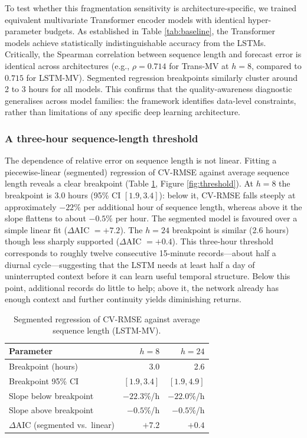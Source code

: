 \documentclass[journal,sensors,submit,pdftex,moreauthors]{Definitions/mdpi}
\begin{document}
To test whether this fragmentation sensitivity is architecture-specific, we trained equivalent multivariate Transformer encoder models with identical hyper-parameter budgets. As established in Table \ref{tab:baseline}, the Transformer models achieve statistically indistinguishable accuracy from the LSTMs. Critically, the Spearman correlation between sequence length and forecast error is identical across architectures (e.g., $\rho = 0.714$ for Trans-MV at $h=8$, compared to $0.715$ for LSTM-MV). Segmented regression breakpoints similarly cluster around 2 to 3 hours for all models. This confirms that the quality-awareness diagnostic generalises across model families: the framework identifies data-level constraints, rather than limitations of any specific deep learning architecture.

\subsubsection{A three-hour sequence-length threshold}

The dependence of relative error on sequence length is not linear. Fitting a piecewise-linear (segmented) regression of CV-RMSE against average sequence length reveals a clear breakpoint (Table \ref{tab:threshold}, Figure \ref{fig:threshold}). At $h=8$ the breakpoint is 3.0 hours (95\% CI $[1.9, 3.4]$): below it, CV-RMSE falls steeply at approximately $-22\%$ per additional hour of sequence length, whereas above it the slope flattens to about $-0.5\%$ per hour. The segmented model is favoured over a simple linear fit ($\Delta$AIC $= +7.2$). The $h=24$ breakpoint is similar (2.6 hours) though less sharply supported ($\Delta$AIC $= +0.4$). This three-hour threshold corresponds to roughly twelve consecutive 15-minute records---about half a diurnal cycle---suggesting that the LSTM needs at least half a day of uninterrupted context before it can learn useful temporal structure. Below this point, additional records do little to help; above it, the network already has enough context and further continuity yields diminishing returns.

\begin{table}[htbp]
    \caption{Segmented regression of CV-RMSE against average sequence length (LSTM-MV).}
    \label{tab:threshold}
    \begin{tabular}{@{}lrr@{}}
        \toprule
        \textbf{Parameter} & \textbf{$h=8$} & \textbf{$h=24$} \\
        \midrule
        Breakpoint (hours)       & 3.0 & 2.6 \\
        Breakpoint 95\% CI       & $[1.9, 3.4]$ & $[1.9, 4.9]$ \\
        Slope below breakpoint   & $-22.3$\%/h & $-22.0$\%/h \\
        Slope above breakpoint   & $-0.5$\%/h  & $-0.5$\%/h \\
        $\Delta$AIC (segmented vs.\ linear) & $+7.2$ & $+0.4$ \\
        \bottomrule
    \end{tabular}
\end{table}
\end{document}
